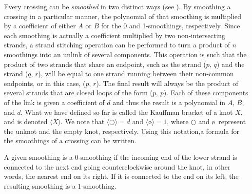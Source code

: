 \begin{paper}
Every crossing can be \textit{smoothed} in two distinct ways (see
\figSmoothings).
By smoothing a crossing in a particular manner, the polynomial of that smoothing
is multiplied by a coefficient of either $A$ or $B$ for the 0 and 1-smoothings,
respectively.
Since each smoothing is actually a coefficient multiplied by two
non-intersecting strands, a strand stitching operation can be performed to turn
a product of $n$ smoothings into an unlink of several components.
This operation is such that the product of two strands that share an endpoint,
such as the strand ($p$, $q$) and the strand ($q$, $r$), will be equal to one
strand running between their non-common endpoints, or in this case, ($p$, $r$).
The final result will always be the product of several strands that are closed
loops of the form ($p$, $p$).
Each of these components of the link is given a coefficient of $d$ and thus the
result is a polynomial in $A$, $B$, and $d$.
What we have defined so far is called the Kauffman bracket of a knot $X$, and is
denoted $\langle X\rangle$.
We note that $\langle\bigcirc\rangle=d$ and $\langle$\o$\rangle=1$, where
$\bigcirc$ and \o~represent the unknot and the empty knot, respectively.
Using this notation,a formula for the smoothings of a crossing can be written.


A given smoothing is a 0-smoothing if the incoming end of the lower strand is
connected to the next end going counterclockwise around the knot, in other
words, the nearest end on its right.
If it is connected to the end on its left, the resulting smoothing is a
1-smoothing.


\end{paper}
